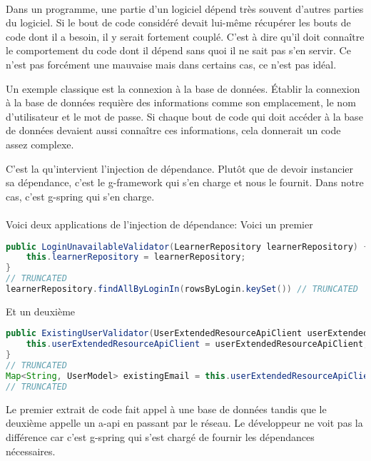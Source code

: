 \paragraph{}
Dans un programme, une partie d'un logiciel dépend très souvent d'autres parties du logiciel.
Si le bout de code considéré devait lui-même récupérer les bouts de code dont il a besoin, il y serait fortement couplé.
C'est à dire qu'il doit connaître le comportement du code dont il dépend sans quoi il ne sait pas s'en servir.
Ce n'est pas forcément une mauvaise mais dans certains cas, ce n'est pas idéal.

Un exemple classique est la connexion à la base de données.
Établir la connexion à la base de données requière des informations comme son emplacement, le nom d'utilisateur et le mot de passe.
Si chaque bout de code qui doit accéder à la base de données devaient aussi connaître ces informations, cela donnerait un code assez complexe.

C'est la qu'intervient l'injection de dépendance.
Plutôt que de devoir instancier\fnmark{} sa dépendance, c'est le \gls{g-framework} qui s'en charge et nous le fournit.
Dans notre cas, c'est \Gls{g-spring} qui s'en charge.

\paragraph{}
Voici deux applications de l'injection de dépendance:
Voici un premier
\begin{lstlisting}[language=Java]
public LoginUnavailableValidator(LearnerRepository learnerRepository) {
    this.learnerRepository = learnerRepository;
}
// TRUNCATED
learnerRepository.findAllByLoginIn(rowsByLogin.keySet()) // TRUNCATED
\end{lstlisting}
Et un deuxième
\begin{lstlisting}[language=Java]
public ExistingUserValidator(UserExtendedResourceApiClient userExtendedResourceApiClient) {
	this.userExtendedResourceApiClient = userExtendedResourceApiClient;
}
// TRUNCATED
Map<String, UserModel> existingEmail = this.userExtendedResourceApiClient.getUserByLoginMapUsingPOST(emails).getBody();
// TRUNCATED
\end{lstlisting}
Le premier extrait de code fait appel à une base de données tandis que le deuxième appelle un \gls{a-api} en passant par le réseau.
Le développeur ne voit pas la différence car c'est \Gls{g-spring} qui s'est chargé de fournir les dépendances nécessaires.

